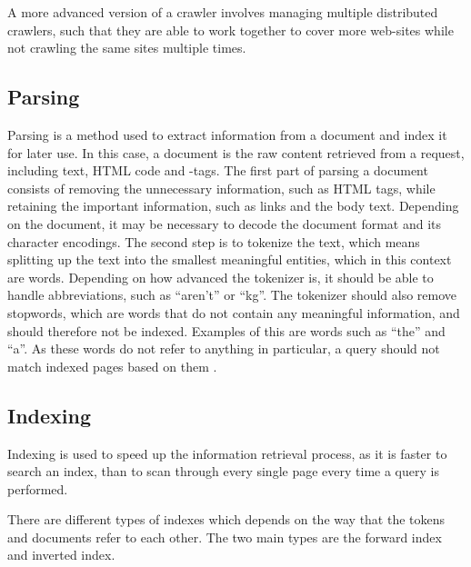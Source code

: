 A more advanced version of a crawler involves managing multiple distributed
crawlers, such that they are able to work together to cover more web-sites while
not crawling the same sites multiple times.


\subsection{Parsing} \label{sec:parsing}
Parsing is a method used to extract information from a document and index it for
later use. In this case, a document is the raw content retrieved from a request,
including text, HTML code and -tags.
The first part of parsing a document consists of removing the unnecessary
information, such as HTML tags, while retaining the important information, such
as links and the body text. Depending on the document, it may be necessary to
decode the document format and its character encodings.
The second step is to tokenize the text, which means splitting up the text into
the smallest meaningful entities, which in this context are words. Depending on
how advanced the tokenizer is, it should be able to handle abbreviations, such
as ``aren't'' or ``kg''. The tokenizer should also remove
stopwords, which are words that do not contain any meaningful information,
and should therefore not be indexed. Examples of this are words such as ``the''
and ``a''. As these words do not refer to anything in particular, a query should
not match indexed pages based on them \citep[Ch. 2]{manning2008introduction}.

\subsection{Indexing}
Indexing is used to speed up the information retrieval process, as it is faster
to search an index, than to scan through every single page every time a query is
performed.

There are different types of indexes which depends on the way that the tokens
and documents refer to each other. The two main types are the forward index and
inverted index.

